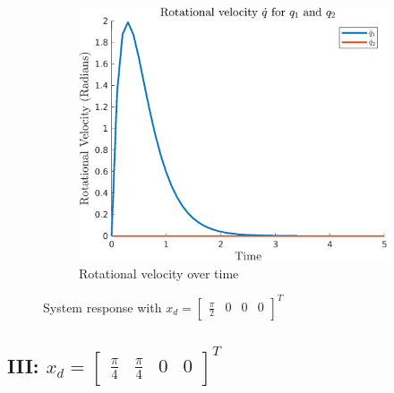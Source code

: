 \documentclass{article}
\begin{document}
\begin{figure}[H]
    \begin{subfigure}{0.325\textwidth}
        \centering
        \includegraphics[width = \textwidth]{figures/rotational-velocity-c2.png}
        \caption{Rotational velocity over time}
    \end{subfigure}
    \caption{System response with $x_d=\begin{bmatrix} \frac{\pi}{2} & 0 & 0 & 0 \end{bmatrix}^T$}
    \label{fig:c-2_results}
\end{figure}


\subsection*{III: $x_d = \begin{bmatrix} \frac{\pi}{4} & \frac{\pi}{4} & 0 & 0 \end{bmatrix}^T$}
\end{document}

